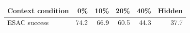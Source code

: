 \begin{tabular}{lrrrrr}
\toprule
Context condition & 0\% & 10\% & 20\% & 40\% & Hidden \\
\midrule
ESAC success & 74.2 & 66.9 & 60.5 & 44.3 & 37.7 \\
\bottomrule
\end{tabular}
